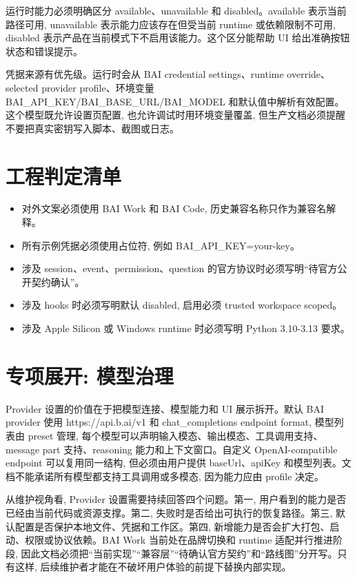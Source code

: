 运行时能力必须明确区分 available、unavailable 和 disabled。available 表示当前路径可用, unavailable 表示能力应该存在但受当前 runtime 或依赖限制不可用, disabled 表示产品在当前模式下不启用该能力。这个区分能帮助 UI 给出准确按钮状态和错误提示。

凭据来源有优先级。运行时会从 BAI credential settings、runtime override、selected provider profile、环境变量 BAI\_API\_KEY/BAI\_BASE\_URL/BAI\_MODEL 和默认值中解析有效配置。这个模型既允许设置页配置, 也允许调试时用环境变量覆盖, 但生产文档必须提醒不要把真实密钥写入脚本、截图或日志。

\section{工程判定清单}
\begin{itemize}
  \item 对外文案必须使用 BAI Work 和 BAI Code, 历史兼容名称只作为兼容名解释。
  \item 所有示例凭据必须使用占位符, 例如 BAI\_API\_KEY=your-key。
  \item 涉及 session、event、permission、question 的官方协议时必须写明“待官方公开契约确认”。
  \item 涉及 hooks 时必须写明默认 disabled, 启用必须 trusted workspace scoped。
  \item 涉及 Apple Silicon 或 Windows runtime 时必须写明 Python 3.10-3.13 要求。
\end{itemize}

\section{专项展开: 模型治理}
Provider 设置的价值在于把模型连接、模型能力和 UI 展示拆开。默认 BAI provider 使用 https://api.b.ai/v1 和 chat\_completions endpoint format, 模型列表由 preset 管理, 每个模型可以声明输入模态、输出模态、工具调用支持、message part 支持、reasoning 能力和上下文窗口。自定义 OpenAI-compatible endpoint 可以复用同一结构, 但必须由用户提供 baseUrl、apiKey 和模型列表。文档不能承诺所有模型都支持工具调用或多模态, 因为能力应由 profile 决定。

从维护视角看, Provider 设置需要持续回答四个问题。第一, 用户看到的能力是否已经由当前代码或资源支撑。第二, 失败时是否给出可执行的恢复路径。第三, 默认配置是否保护本地文件、凭据和工作区。第四, 新增能力是否会扩大打包、启动、权限或协议依赖。BAI Work 当前处在品牌切换和 runtime 适配并行推进阶段, 因此文档必须把“当前实现”“兼容层”“待确认官方契约”和“路线图”分开写。只有这样, 后续维护者才能在不破坏用户体验的前提下替换内部实现。

